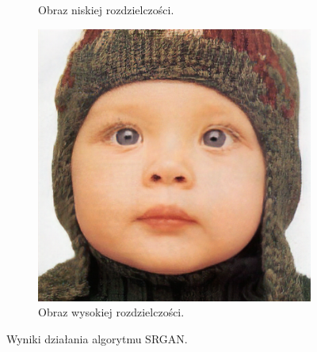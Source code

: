 \documentclass[a4paper,11pt, notitlepage ]{article}
\begin{document}
\begin{figure}[h!]
\begin{subfigure}[b]{0.4\linewidth}
		\caption{Obraz  niskiej rozdzielczości.}
	\end{subfigure}
	\begin{subfigure}[b]{0.4\linewidth}
		\includegraphics[width=\linewidth]{SRGAN/output_SRGAN.png}
		\caption{Obraz wysokiej rozdzielczości.}
	\end{subfigure}
	\caption{Wyniki działania algorytmu SRGAN.}
	\label{fig:coffee3}
\end{figure}
\end{document}

